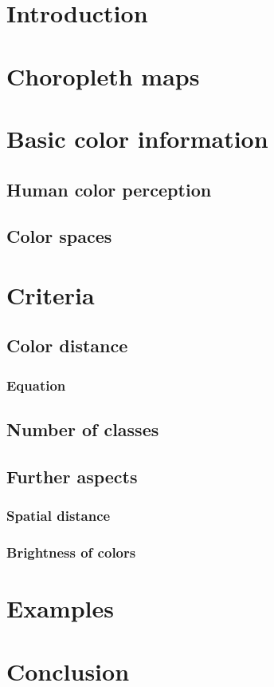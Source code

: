 \section{Introduction}

\section{Choropleth maps}

\section{Basic color information}

\subsection{Human color perception}

\subsection{Color spaces}

\section{Criteria}

\subsection{Color distance}
\parencite{brychtova2015}
\parencite{brychtova2017}
\parencite{sharma2005}
\parencite{coltekin2015}
\parencite{coltekin2017}

\subsubsection{Equation}

\subsection{Number of classes}

\subsection{Further aspects}

\subsubsection{Spatial distance}

\subsubsection{Brightness of colors}

\section{Examples}

\section{Conclusion}

